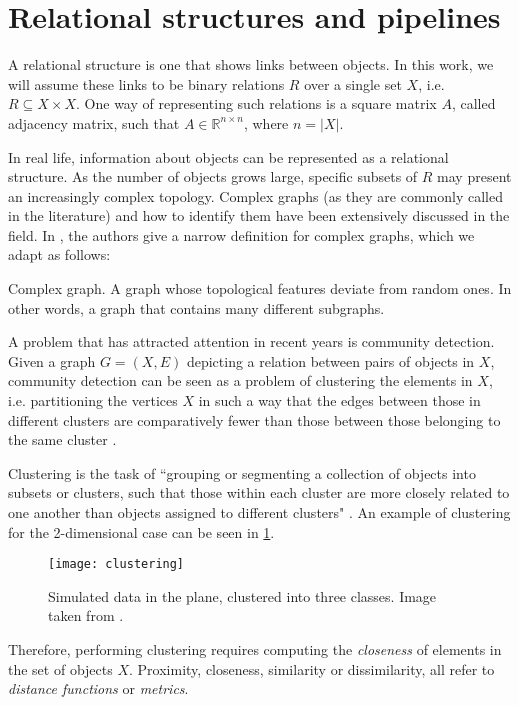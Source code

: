 \documentclass[../main.tex]{subfiles} \label{chapter_soa}
\begin{document}
\section{Relational structures and pipelines}\label{general_pipeline}
A relational structure is one that shows links between objects. In this work, we will assume these links to be binary relations $R$ over a single set $X$, i.e. $R \subseteq X \times X$. One way of representing such relations is a square matrix $A$, called adjacency matrix, such that $A \in \mathbb{R}^{n \times n}$, where $n =\left\vert{X}\right\vert$.
\par In real life, information about objects can be represented as a relational structure. As the number of objects grows large, specific subsets of $R$ may present an increasingly complex topology. Complex graphs (as they are commonly called in the literature) and how to identify them have been extensively discussed in the field. In \cite{Kim2008}, the authors give a narrow definition for complex graphs, which we adapt as follows:
\theoremstyle{definition}
\begin{definition}{Complex graph}. A graph whose topological features deviate from random ones. In other words, a graph that contains many different subgraphs.
\end{definition}
\par A problem that has attracted attention in recent years is community detection. Given a graph $G = (X, E)$ depicting a relation between pairs of objects in $X$, community detection can be seen as a problem of clustering the elements in $X$, i.e. partitioning the vertices $X$ in such a way that the edges between those in different clusters are comparatively fewer than those between those belonging to the same cluster \cite{Fortunato2010}. 
\par Clustering is the task of ``grouping or segmenting a collection of objects into subsets or clusters, such that those within each cluster are more closely related to one another than objects assigned to different clusters" \cite{hastie2008}. An example of clustering for the 2-dimensional case can be seen in \ref{clustering}.
\begin{figure}[ht]
\centering
\texttt{[image: clustering]}
\caption{Simulated data in the plane, clustered into three classes. Image taken from \cite{hastie2008}.}
\label{clustering}
\end{figure}
\par Therefore, performing clustering requires computing the \emph{closeness} of elements in the set of objects $X$. Proximity, closeness, similarity or dissimilarity, all refer to \emph{distance functions} or \emph{metrics}. 
\end{document}
